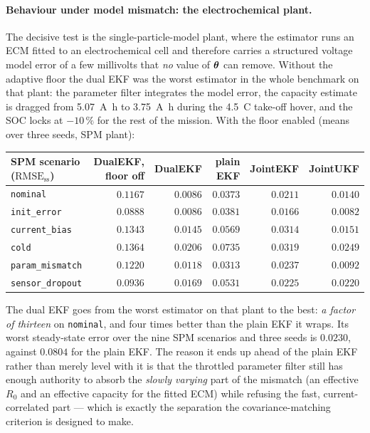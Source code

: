 \paragraph{Behaviour under model mismatch: the electrochemical plant.}
\label{sec:de-spm}
The decisive test is the single-particle-model plant, where the estimator runs an ECM fitted to an
electrochemical cell and therefore carries a structured voltage model error of a few millivolts that
\emph{no} value of $\bm{\theta}$ can remove.  Without the adaptive floor the dual EKF was the worst
estimator in the whole benchmark on that plant: the parameter filter integrates the model error, the
capacity estimate is dragged from \SI{5.07}{\ampere\hour} to \SI{3.75}{\ampere\hour} during the
\SI{4.5}{C} take-off hover, and the SOC locks at $-10\,\%$ for the rest of the mission.  With the
floor enabled (means over three seeds, SPM plant):
\begin{center}
\begin{tabular}{@{}lrrrrr@{}}
\toprule
SPM scenario ($\text{RMSE}_\text{ss}$) & DualEKF, floor off & \textbf{DualEKF} & plain EKF & JointEKF & JointUKF\\
\midrule
\texttt{nominal}        & $0.1167$ & $\mathbf{0.0086}$ & $0.0373$ & $0.0211$ & $0.0140$\\
\texttt{init\_error}    & $0.0888$ & $\mathbf{0.0086}$ & $0.0381$ & $0.0166$ & $0.0082$\\
\texttt{current\_bias}  & $0.1343$ & $\mathbf{0.0145}$ & $0.0569$ & $0.0314$ & $0.0151$\\
\texttt{cold}           & $0.1364$ & $\mathbf{0.0206}$ & $0.0735$ & $0.0319$ & $0.0249$\\
\texttt{param\_mismatch}& $0.1220$ & $\mathbf{0.0118}$ & $0.0313$ & $0.0237$ & $0.0092$\\
\texttt{sensor\_dropout}& $0.0936$ & $\mathbf{0.0169}$ & $0.0531$ & $0.0225$ & $0.0220$\\
\bottomrule
\end{tabular}
\end{center}
The dual EKF goes from the worst estimator on that plant to the best: \emph{a factor of
thirteen} on \texttt{nominal}, and four times better than the plain EKF it wraps.  Its worst
steady-state error over the nine SPM scenarios and three seeds is $0.0230$, against $0.0804$ for the
plain EKF.  The reason it ends up ahead of the plain EKF rather than merely level with it is that the
throttled parameter filter still has enough authority to absorb the \emph{slowly varying} part of the
mismatch (an effective $R_0$ and an effective capacity for the fitted ECM) while refusing the fast,
current-correlated part --- which is exactly the separation the covariance-matching criterion is
designed to make.

